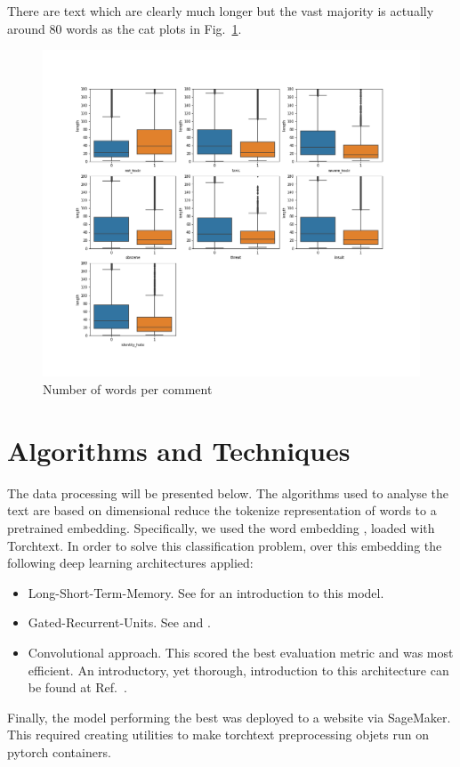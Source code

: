 \documentclass{report}
\begin{document}
There are text which are clearly much longer but the vast majority is actually around 80 words as the cat plots in Fig.~\ref{fig:catplots}.
\begin{figure}[!h]
\centering
  \includegraphics[width=170mm]{../local/plots_tables/catplots.png}
  \caption{Number of words per comment}
  \label{fig:catplots}
\end{figure}

\section{Algorithms and Techniques}

The data processing will be presented below.  The algorithms used to analyse the text are based 
on dimensional reduce the tokenize representation of words to a pretrained embedding. Specifically, 
we used the word embedding \cite{Glove},
loaded with Torchtext. In order to solve this classification problem,  over this embedding the following deep learning 
architectures applied:
\begin{itemize}
\item Long-Short-Term-Memory.  See \cite{NG} for an introduction to this model.
\item Gated-Recurrent-Units.  See \cite{NG} and \cite{Udacity}.
\item Convolutional approach. This scored the best evaluation metric
and was most efficient. An introductory, yet thorough, introduction to this
architecture can be found at Ref.~\cite{BT}.
\end{itemize}
Finally, the model performing the best was deployed to a website via SageMaker. This required creating utilities to make 
torchtext preprocessing objets run on pytorch containers. 
\end{document}
